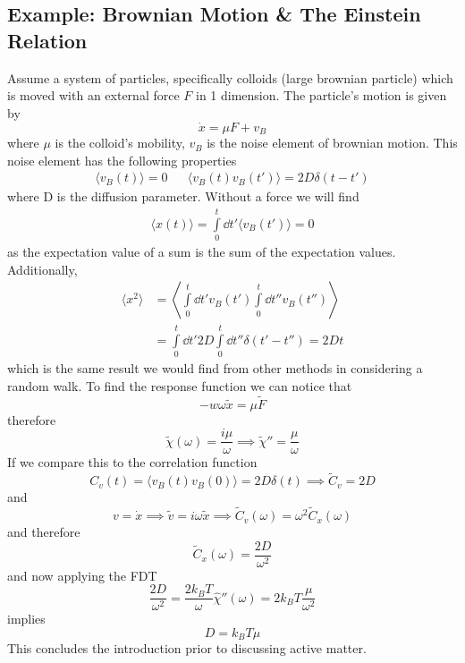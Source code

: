 \subsection{Example: Brownian Motion \& The Einstein Relation}
Assume a system of particles, specifically colloids (large brownian particle) which is moved with an external force $F$ in 1 dimension. The particle's motion is given by
\begin{equation}
	\dot x = \mu F + v_B
\end{equation}
where $\mu$ is the colloid's mobility, $v_B$ is the noise element of brownian motion. This noise element has the following properties
\begin{align}
	\langle v_B(t)\rangle = 0 && \langle v_B(t)v_B(t')\rangle = 2D\delta(t-t')
\end{align}
where D is the diffusion parameter. Without a force we will find
\begin{align}
	\langle x(t) \rangle = \int\limits_0^t\dd t' \langle v_B(t')\rangle = 0
\end{align}
as the expectation value of a sum is the sum of the expectation values. Additionally,
\begin{align}
	\langle x^2 \rangle &= \left\langle \int\limits_0^t\dd t' v_B(t')\int\limits_0^t\dd t'' v_B(t'')\right\rangle\\
	&= \int\limits_0^t\dd t' 2D \int\limits_0^t\dd t'' \delta(t'-t'') = 2Dt
\end{align}
which is the same result we would find from other methods in considering a random walk. To find the response function we can notice that
\begin{equation}
	-w\omega \tilde x = \mu \tilde F
\end{equation}
therefore
\begin{equation}
	\tilde \chi(\omega) = \frac{i\mu}{\omega} \implies \tilde\chi'' = \frac{\mu}{\omega}
\end{equation}
If we compare this to the correlation function
\begin{equation}
	C_v(t) = \langle v_B(t)v_B(0)\rangle = 2D\delta(t) \implies \tilde C_v = 2D
\end{equation}
and
\begin{equation}
	v=\dot x \implies \tilde v = i\omega \tilde x \implies \tilde C_v(\omega) = \omega^2\tilde C_x(\omega)
\end{equation}
and therefore
\begin{equation}
	\boxed{\tilde C_x(\omega) = \frac{2D}{\omega^2}}
\end{equation}
and now applying the FDT
\begin{equation}
	\frac{2D}{\omega^2} = \frac{2k_BT}{\omega}\hat\chi''(\omega) = 2k_BT\frac{\mu}{\omega^2}
\end{equation}
implies
\begin{equation}
	\boxed{D = k_BT\mu}
\end{equation}
This concludes the introduction prior to discussing active matter.
\newpage
